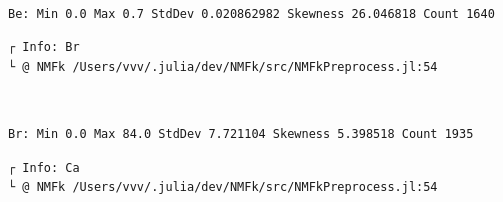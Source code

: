 \documentclass[11pt]{article}
\begin{document}
    \begin{center}
    \end{center}
    { \hspace*{\fill} \\}

    \begin{Verbatim}[commandchars=\\\{\}]
Be: Min 0.0 Max 0.7 StdDev 0.020862982 Skewness 26.046818 Count 1640
    \end{Verbatim}

    \begin{Verbatim}[commandchars=\\\{\}]
┌ Info: Br
└ @ NMFk /Users/vvv/.julia/dev/NMFk/src/NMFkPreprocess.jl:54
    \end{Verbatim}

    \begin{center}
    \end{center}
    { \hspace*{\fill} \\}

    \begin{Verbatim}[commandchars=\\\{\}]
Br: Min 0.0 Max 84.0 StdDev 7.721104 Skewness 5.398518 Count 1935
    \end{Verbatim}

    \begin{Verbatim}[commandchars=\\\{\}]
┌ Info: Ca
└ @ NMFk /Users/vvv/.julia/dev/NMFk/src/NMFkPreprocess.jl:54
    \end{Verbatim}

    \begin{center}
    \end{center}
    { \hspace*{\fill} \\}

    \begin{center}
    \end{center}
    { \hspace*{\fill} \\}
\end{document}
